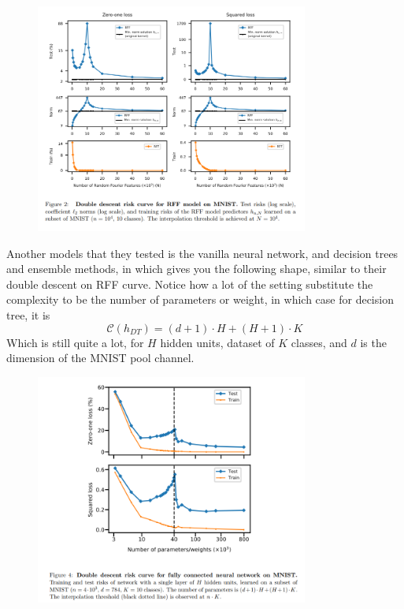 \begin{figure}[h!]
    \centering
    \includegraphics[width=0.8\textwidth]{img/RFFDD.png}
\end{figure}
Another models that they tested is the vanilla neural network, and decision trees and ensemble methods, in which gives you the following shape, similar to their double descent on RFF curve. Notice how a lot of the setting substitute the complexity to be the number of parameters or weight, in which case for decision tree, it is \begin{equation*}
    \mathcal{C}(h_{DT}) = (d+1)\cdot H + (H+1)\cdot K
\end{equation*} 
Which is still quite a lot, for $H$ hidden units, dataset of $K$ classes, and $d$ is the dimension of the MNIST pool channel. 
\begin{figure}[h!]
    \centering
    \includegraphics[width=0.8\textwidth]{img/decisionDD.png}
\end{figure}
